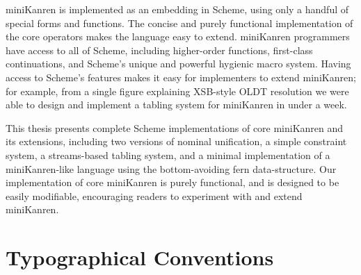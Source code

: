 
miniKanren is implemented as an embedding in Scheme, using only a
handful of special forms and functions.  The concise and purely
functional implementation of the core operators makes the language
easy to extend.  miniKanren programmers have access to all of Scheme,
including higher-order functions, first-class continuations, and
Scheme's unique and powerful hygienic macro system.  Having access to
Scheme's features makes it easy for implementers to extend miniKanren;
for example, from a single figure explaining XSB-style OLDT resolution
we were able to design and implement a tabling system for miniKanren
in under a week.

This thesis presents complete Scheme implementations of core
miniKanren and its extensions, including two versions of nominal
unification, a simple constraint system, a streams-based tabling
system, and a minimal implementation of a miniKanren-like language
using the bottom-avoiding fern data-structure.  Our implementation of
core miniKanren is purely functional, and is designed to be easily
modifiable, encouraging readers to experiment with and extend
miniKanren.

\section{Typographical Conventions}


